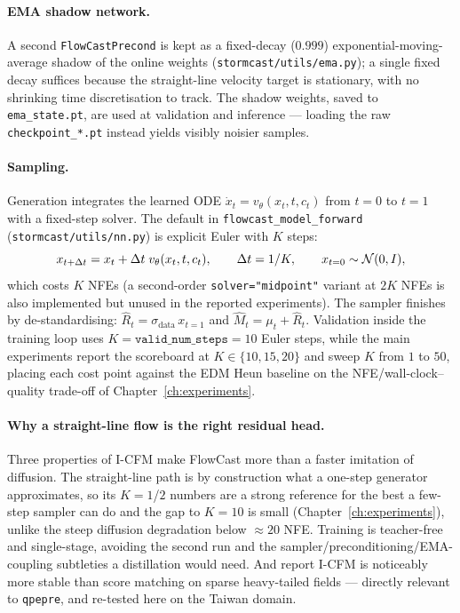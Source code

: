 \paragraph{EMA shadow network.} A second \texttt{FlowCastPrecond} is kept as a fixed-decay ($0.999$) exponential-moving-average shadow of the online weights (\texttt{stormcast/utils/ema.py}); a single fixed decay suffices because the straight-line velocity target is stationary, with no shrinking time discretisation to track. The shadow weights, saved to \texttt{ema\_state.pt}, are used at validation and inference --- loading the raw \texttt{checkpoint\_*.pt} instead yields visibly noisier samples.

\paragraph{Sampling.} Generation integrates the learned ODE $\dot{x}_t = v_\theta(x_t, t, c_t)$ from $t = 0$ to $t = 1$ with a fixed-step solver. The default in \texttt{flowcast\_model\_forward} (\texttt{stormcast/utils/nn.py}) is explicit Euler with $K$ steps:
\begin{equation}
  x_{t + \Delta t} = x_t + \Delta t\;v_\theta(x_t, t, c_t),
  \qquad \Delta t = 1 / K,
  \qquad x_{t=0} \sim \mathcal{N}(0, I),
  \label{eq:flowcast-sampler}
\end{equation}
which costs $K$ NFEs (a second-order \texttt{solver="midpoint"} variant at $2K$ NFEs is also implemented but unused in the reported experiments). The sampler finishes by de-standardising: $\hat{R}_t = \sigma_{\text{data}}\,x_{t=1}$ and $\hat{M}_t = \mu_t + \hat{R}_t$. Validation inside the training loop uses $K = \texttt{valid\_num\_steps} = 10$ Euler steps, while the main experiments report the scoreboard at $K \in \{10, 15, 20\}$ and sweep $K$ from $1$ to $50$, placing each cost point against the EDM Heun baseline on the NFE/wall-clock--quality trade-off of Chapter~\ref{ch:experiments}.

\paragraph{Why a straight-line flow is the right residual head.} Three properties of I-CFM make FlowCast more than a faster imitation of diffusion. The straight-line path is by construction what a one-step generator approximates, so its $K = 1$/$2$ numbers are a strong reference for the best a few-step sampler can do and the gap to $K = 10$ is small (Chapter~\ref{ch:experiments}), unlike the steep diffusion degradation below $\approx 20$ NFE. Training is teacher-free and single-stage, avoiding the second run and the sampler/preconditioning/EMA-coupling subtleties a distillation would need. And \citet{ribeiro2025flowcast} report I-CFM is noticeably more stable than score matching on sparse heavy-tailed fields --- directly relevant to \texttt{qpepre}, and re-tested here on the Taiwan domain.

